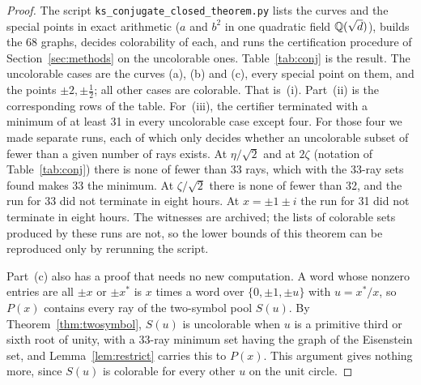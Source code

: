 \begin{proof}
The script \texttt{ks\_conjugate\_closed\_theorem.py} lists the curves and the special points in
exact arithmetic ($a$ and $b^2$ in one quadratic field $\mathbb{Q}(\sqrt d)$), builds the 68 graphs, decides colorability of
each, and runs the certification procedure of Section~\ref{sec:methods} on the uncolorable ones.
Table~\ref{tab:conj} is the result.  The uncolorable cases are the curves (a), (b) and (c), every
special point on them, and the points $\pm2,\pm\tfrac12$; all other cases are colorable.  That
is~(i).  Part~(ii) is the corresponding rows of the table.  For~(iii), the certifier terminated
with a minimum of at least 31 in every uncolorable case except four.  For those four we made
separate runs, each of which only decides whether an uncolorable subset of fewer than a given
number of rays exists.  At $\eta/\sqrt2$ and at $2\zeta$
(notation of Table~\ref{tab:conj}) there is none of fewer than 33 rays,
which with the 33-ray sets found makes 33 the minimum.  At $\zeta/\sqrt2$ there is none of
fewer than 32, and the run for 33 did not terminate in eight hours.  At $x=\pm1\pm i$ the run
for 31 did not terminate in eight hours.  The
witnesses are archived; the lists of colorable sets produced by these runs are not, so the
lower bounds of this theorem can be reproduced only by rerunning the script.

Part~(c) also has a proof that needs no new computation.  A word whose nonzero entries are all
$\pm x$ or $\pm x^{*}$ is $x$ times a word over $\{0,\pm1,\pm u\}$ with $u=x^{*}/x$, so $P(x)$
contains every ray of the two-symbol pool $S(u)$.  By Theorem~\ref{thm:twosymbol}, $S(u)$ is
uncolorable when $u$ is a primitive third or sixth root of unity, with a 33-ray minimum set
having the graph of the Eisenstein set, and Lemma~\ref{lem:restrict} carries this to $P(x)$.
This argument gives nothing more, since $S(u)$ is colorable for every other $u$ on the unit
circle.
\end{proof}

